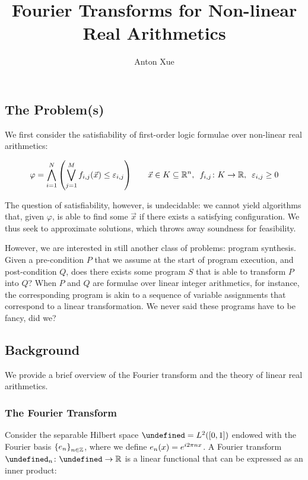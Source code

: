 \documentclass[12pt]{article}
\title{Fourier Transforms for Non-linear Real Arithmetics}
\author{Anton Xue}
\date{}
\let\H\undefined
\newcommand{\H}{\mathcal{H}}
\let\F\undefined
\newcommand{\F}{\mathcal{F}}
\begin{document}
\maketitle

\subsection{The Problem(s)}
We first consider the satisfiability of first-order logic formulae over
non-linear real arithmetics:

\begin{align*}
  \varphi
    = \bigwedge_{i = 1}^{N} {\left(\bigvee_{j = 1}^{M}
        f_{i, j}{\left(\vec{x}\right)} \leq \varepsilon_{i, j}\right)}
  \qquad
  \vec{x} \in K \subseteq {\mathbb{R}}^n, \enskip
  {f_{i, j} \colon K \to {\mathbb{R}}}, \enskip
  \varepsilon_{i, j} \geq 0
\end{align*}

The question of satisfiability, however, is undecidable:
we cannot yield algorithms that, given $\varphi$, is able to find some
$\vec{x}$ if there exists a satisfying configuration.
We thus seek to approximate solutions, which throws away soundness for
feasibility.

However, we are interested in still another class of problems:
program synthesis.
Given a pre-condition $P$ that we assume at the start of program execution,
and post-condition $Q$, does there exists some program $S$ that is able to
transform $P$ into $Q$?
When $P$ and $Q$ are formulae over linear integer arithmetics, for instance,
the corresponding program is akin to a sequence of variable assignments
that correspond to a linear transformation.
We never said these programs have to be fancy, did we?


\subsection{Background}
We provide a brief overview of the Fourier transform and the theory of linear
real arithmetics.

\subsubsection{The Fourier Transform}
Consider the separable Hilbert space $\H = L^2 \parens{\brackets{0, 1}}$
endowed with the Fourier basis ${\left\{e_n\right\}}_{n \in {\mathbb{Z}}}$, where we define
$e_n {\left(x\right)} = e^{i 2\pi n x}$.
A Fourier transform $\type{\F_n}{\H}{\R}$ is a linear functional that can
be expressed as an inner product:
\end{document}
